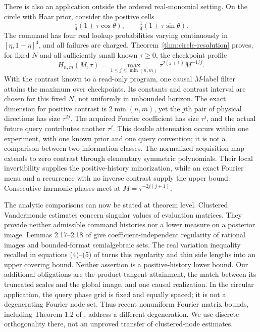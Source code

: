 There is also an application outside the ordered real-monomial setting.
On the circle with Haar prior, consider the positive cells
\[
 \tfrac14(1\pm\tau\cos\theta),\qquad
 \tfrac14(1\pm\tau\sin\theta).
\]
The command has four real lookup probabilities varying continuously
in $[\eta,1-\eta]^4$, and all failures are charged. Theorem~\ref{thm:circle-resolution} proves, for fixed $N$
and all sufficiently small known $\tau\ge0$, the checkpoint profile
\[
 H_{n,m}(M,\tau)=
 \max_{1\le j\le\min(n,m)}\tau^{2(j+1)}M^{-1/j}.
\]
With the contrast known to a read-only program, one causal $M$-label
filter attains the maximum over checkpoints. Its constants and
contrast interval are chosen for this fixed $N$, not uniformly in
unbounded horizon. The
exact dimension for positive contrast is $2\min(n,m)$, yet the $j$th
pair of physical directions has size $\tau^{2j}$. The acquired Fourier
coefficient has size $\tau^j$, and the actual future query contributes
another $\tau^j$. This double attenuation occurs within one experiment,
with one known prior and one query convention; it is not a comparison
between two information classes. The normalized acquisition map extends
to zero contrast through elementary symmetric polynomials. Their local
invertibility supplies the positive-history minorization, while an exact
Fourier menu and a recurrence with no inverse contrast supply the upper
bound. Consecutive harmonic phases meet at
$M=\tau^{-2j(j+1)}$.

The analytic comparisons can now be stated at theorem level.
Clustered Vandermonde estimates \cite{BatenkovEtAl}
concern singular values of evaluation matrices. They provide neither
admissible command histories nor a lower measure on a posterior image.
Lemmas 2.17--2.18 of \cite{ZhangKileel} give coefficient-independent
regularity of rational images and bounded-format semialgebraic sets.
The real variation inequality recalled in equations (4)--(5) of
\cite{ComteHalupczok} turns this regularity and thin side lengths into
an upper covering bound. Neither assertion is a positive-history lower
bound. Our additional obligations are the product-tangent attainment,
the match between its truncated scales and the global image, and one
causal realization. In the circular application, the query phase grid
is fixed and equally spaced; it is not a degenerating Fourier node set.
Thus recent nonuniform Fourier matrix bounds, including Theorem 1.2 of
\cite{ChenLinZhang}, address a different degeneration. We use discrete
orthogonality there, not an unproved transfer of clustered-node estimates.

